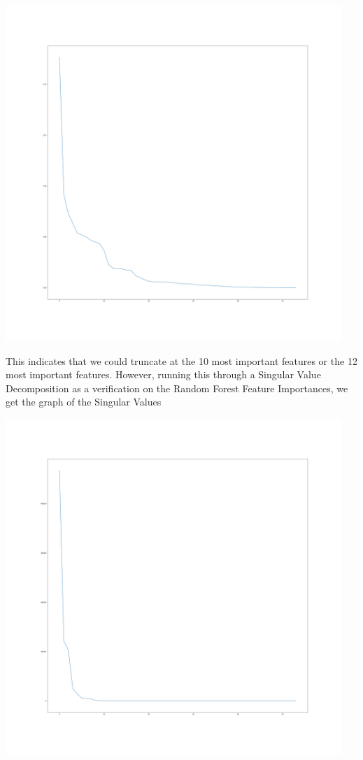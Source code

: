 \documentclass{article}[12pt]
\numberwithin{equation}{subsection}
\begin{document}
\begin{center}
\includegraphics[width=5in]{../randForImpt.png}
\end{center}

\begin{flushleft}

This indicates that we could truncate at the 10 most important features or the 12 most important features.  However, running this through a Singular Value Decomposition as a verification on the Random Forest Feature Importances, we get the graph of the Singular Values

\end{flushleft}

\begin{center}
\includegraphics[width=5in]{../SVDimport.png}
\end{center}
\end{document}
